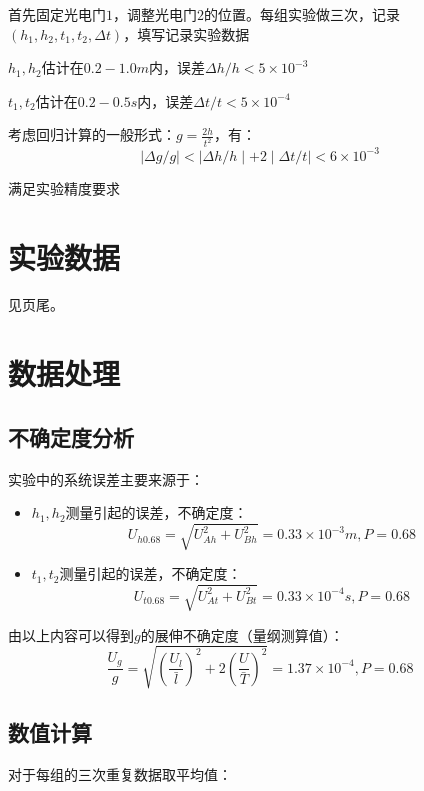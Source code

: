\documentclass[a4paper]{ltxdoc}
\begin{document}
\begin{multicols}{2}
    首先固定光电门$1$，调整光电门$2$的位置。每组实验做三次，记录$(h_1,h_2,t_1,t_2,\Delta t)$，填写记录实验数据
    \smallskip

    $h_1,h_2$估计在$0.2-1.0 m$内，误差$\Delta h/h<5\times 10^{-3}$

    $t_1,t_2$估计在$0.2-0.5 s$内，误差$\Delta t/t<5\times 10^{-4}$

    \smallskip
    考虑回归计算的一般形式：$g=\frac {2h} {t^2}$，有：
    \begin{equation}
        \mid \Delta g /g \mid <\mid \Delta h/h\mid +2\mid \Delta t/t\mid<6\times 10^{-3}
    \end{equation}

    满足实验精度要求
    \section{实验数据}

    见页尾。
    \section{数据处理}
    \subsection{不确定度分析}
    实验中的系统误差主要来源于：
    \begin{itemize}
        \item $h_1,h_2$测量引起的误差，不确定度：
              $$
                  U_{h 0.68}=\sqrt{U_{Ah}^2 + U_{Bh}^2} = 0.33 \times 10^{-3} m,P=0.68
              $$
        \item $t_1,t_2$测量引起的误差，不确定度：
              $$
                  U_{t 0.68}=\sqrt{U_{At}^2 + U_{Bt}^2} = 0.33 \times 10^{-4} s,P=0.68
              $$
    \end{itemize}

    由以上内容可以得到$g$的展伸不确定度（量纲测算值）：
    $$
        \frac{U_g}{g} =\sqrt{(\frac{U_l}{\bar l})^2 + 2(\frac{U}{\bar T})^2} = 1.37\times 10^{-4},P=0.68
    $$
    \subsection{数值计算}
    对于每组的三次重复数据取平均值：


\end{multicols}
\end{document}
